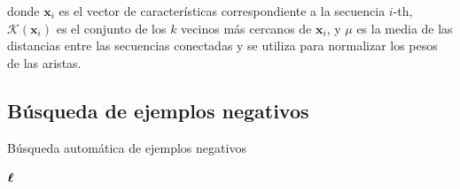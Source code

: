 \noindent donde $\mathbf{x}_{i}$ es el vector de características correspondiente a la secuencia $i$-th, $\mathcal{K} (\mathbf{x}_{i})$ es el conjunto de los
$k$ vecinos más cercanos de $\mathbf{x}_{i}$, y $\mu$ es la media de las distancias entre las secuencias conectadas y se  utiliza para normalizar los pesos de
las aristas.

\subsection{Búsqueda de ejemplos negativos}

\renewcommand{\algorithmicrequire}{\textbf{Entrada:}}
\renewcommand{\algorithmicensure}{\textbf{Salida:}}
\renewcommand{\algorithmicrepeat}{\textbf{repetir}}
\renewcommand{\algorithmicuntil}{\textbf{mientras}}
\renewcommand{\algorithmicreturn}{\textbf{delvolver}}
\begin{algorithm}[tpb]
	\caption{Búsqueda automática de ejemplos negativos}
	\label{algNS}
	\begin{algorithmic}[1]
		\REPEAT
		\RETURN $\boldsymbol\ell$
	\end{algorithmic}
\end{algorithm}

